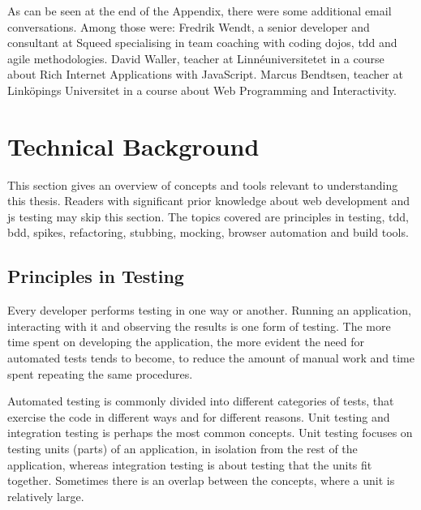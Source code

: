 \documentclass[11pt]{article}
\begin{document}
As can be seen at the end of the Appendix, there were some additional email conversations. Among those were: Fredrik Wendt, a senior developer and consultant at Squeed specialising in team coaching with coding dojos, \gls{tdd} and agile methodologies. David Waller, teacher at Linnéuniversitetet in a course about Rich Internet Applications with JavaScript. Marcus Bendtsen, teacher at Linköpings Universitet in a course about Web Programming and Interactivity.


\section{Technical Background}
\label{sec:technicalbackground}

This section gives an overview of concepts and tools relevant to understanding this thesis. Readers with significant prior knowledge about web development and \gls{js} testing may skip this section. The topics covered are principles in testing, \gls{tdd}, \gls{bdd}, spikes, refactoring, stubbing, mocking, browser automation and build tools.

\subsection{Principles in Testing}
\label{subsec:testingbasics}

Every developer performs testing in one way or another. Running an application, interacting with it and observing the results is one form of testing. The more time spent on developing the application, the more evident the need for automated tests tends to become, to reduce the amount of manual work and time spent repeating the same procedures.

Automated testing is commonly divided into different categories of tests, that exercise the code in different ways and for different reasons. Unit testing and integration testing is perhaps the most common concepts. Unit testing focuses on testing units (parts) of an application, in isolation from the rest of the application, whereas integration testing is about testing that the units fit together. Sometimes there is an overlap between the concepts, where a unit is relatively large.
\end{document}
